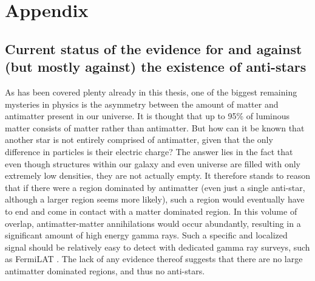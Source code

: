 \section{Appendix}
\subsection{Current status of the evidence for and against (but mostly against) the existence of anti-stars}
As has been covered plenty already in this thesis, one of the biggest remaining mysteries in physics is the asymmetry between the amount of matter and antimatter present in our universe. It is thought that up to 95\% of luminous matter consists of matter rather than antimatter. But how can it be known that another star is not entirely comprised of antimatter, given that the only difference in particles is their electric charge? The answer lies in the fact that even though structures within our galaxy and even universe are filled with only extremely low densities, they are not actually empty. It therefore stands to reason that if there were a region dominated by antimatter (even just a single anti-star, although a larger region seems more likely), such a region would eventually have to end and come in contact with a matter dominated region. In this volume of overlap, antimatter-matter annihilations would occur abundantly, resulting in a significant amount of high energy gamma rays. Such a specific and localized signal should be relatively easy to detect with dedicated gamma ray surveys, such as FermiLAT \cite{FermiLAT_Point_Sources}. The lack of any evidence thereof suggests that there are no large antimatter dominated regions, and thus no anti-stars. 
